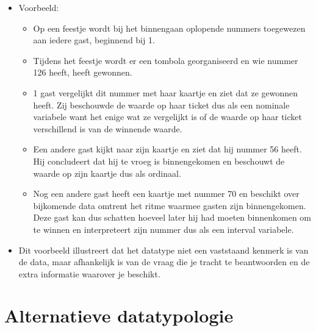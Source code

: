 \documentclass[]{memoir}
\providecommand{\tightlist}{%
  \setlength{\itemsep}{0pt}\setlength{\parskip}{0pt}}
\begin{document}
\begin{itemize}
\tightlist
\item
  Voorbeeld:

  \begin{itemize}
  \tightlist
  \item
    Op een feestje wordt bij het binnengaan oplopende nummers toegewezen
    aan iedere gast, beginnend bij 1.
  \item
    Tijdens het feestje wordt er een tombola georganiseerd en wie nummer
    126 heeft, heeft gewonnen.
  \item
    1 gast vergelijkt dit nummer met haar kaartje en ziet dat ze
    gewonnen heeft. Zij beschouwde de waarde op haar ticket dus als een
    nominale variabele want het enige wat ze vergelijkt is of de waarde
    op haar ticket verschillend is van de winnende waarde.
  \item
    Een andere gast kijkt naar zijn kaartje en ziet dat hij nummer 56
    heeft. Hij concludeert dat hij te vroeg is binnengekomen en
    beschouwt de waarde op zijn kaartje dus als ordinaal.
  \item
    Nog een andere gast heeft een kaartje met nummer 70 en beschikt over
    bijkomende data omtrent het ritme waarmee gasten zijn binnengekomen.
    Deze gast kan dus schatten hoeveel later hij had moeten binnenkomen
    om te winnen en interpreteert zijn nummer dus als een interval
    variabele.
  \end{itemize}
\item
  Dit voorbeeld illustreert dat het datatype niet een vaststaand kenmerk
  is van de data, maar afhankelijk is van de vraag die je tracht te
  beantwoorden en de extra informatie waarover je beschikt.
\end{itemize}

\section{Alternatieve datatypologie}\label{alternatieve-datatypologie}
\end{document}
